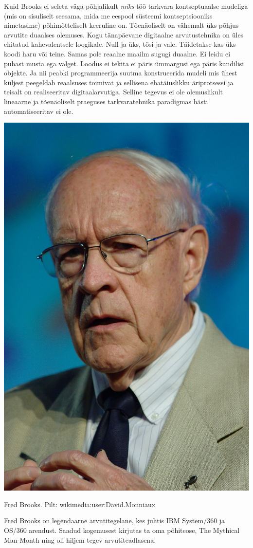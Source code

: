 \documentclass{tufte-book}
\begin{document}
Kuid Brooks ei seleta väga põhjalikult \emph{miks} töö tarkvara kontseptuaalse mudeliga (mis on sisuliselt seesama, mida me eespool süsteemi kontseptsiooniks nimetasime) põhimõtteliselt keeruline on. Tõenäoliselt on vähemalt üks põhjus arvutite duaalses olemuses. Kogu tänapäevane digitaalne arvutustehnika on üles ehitatud kahevalentsele loogikale. Null ja üks, tõsi ja vale. Täidetakse kas üks koodi haru või teine. Samas pole reaalne maailm sugugi duaalne. Ei leidu ei puhast musta ega valget. Loodus ei tekita ei päris ümmargusi ega päris kandilisi objekte. Ja nii peabki programmeerija suutma konstrueerida mudeli mis ühest küljest peegeldab reaalsuses toimivat ja sellisena ebatäiuslikku äriprotsessi ja teisalt on realiseeritav digitaalarvutiga. Selline tegevus ei ole olemuslikult lineaarne ja tõenäoliselt praeguses tarkvaratehnika paradigmas hästi automatiseeritav ei ole. 

\begin{marginfigure}
		\begin{center}
		\includegraphics[width=.7\linewidth]{682px-Frederick_Brooks_IMG_2279.jpg}
		\caption{Fred Brooks. Pilt: wikimedia:user:David.Monniaux}
		\label{fig:brooks}
		\end{center}
		Fred Brooks on legendaarne arvutitegelane, kes juhtis IBM System/360 ja OS/360 arendust. Saadud kogemusest kirjutas ta oma põhiteose, The Mythical Man-Month ning oli hiljem tegev arvutiteadlasena. 
\end{marginfigure}
\end{document}
